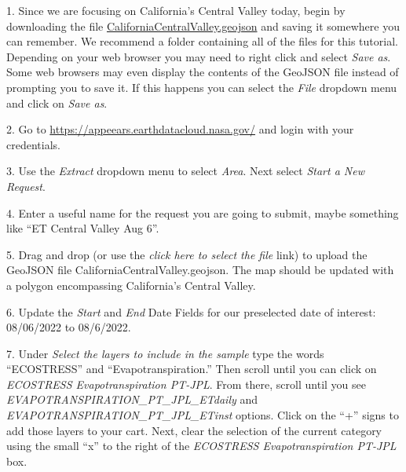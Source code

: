 \documentclass[oneside,a4paper,11pt,explicit]{book}
\begin{document}
1. Since we are focusing on California's Central Valley today, begin by downloading the file \href{https://jeremydforsythe.github.io/icecream-tutorials/Tutorial9_Evaportranspiration1/CaliforniaCentralValley.geojson}{CaliforniaCentralValley.geojson} and saving it somewhere you can remember. We recommend a folder containing all of the files for this tutorial. Depending on your web browser you may need to right click and select \textit{Save as}. Some web browsers may even display the contents of the GeoJSON file instead of prompting you to save it. If this happens you can select the \textit{File} dropdown menu and click on \textit{Save as}. 


2. Go to \href{https://appeears.earthdatacloud.nasa.gov/}{https://appeears.earthdatacloud.nasa.gov/} and login with your credentials. 

3. Use the \textit{Extract} dropdown menu to select \textit{Area}. Next select \textit{Start a New Request}. 

4. Enter a useful name for the request you are going to submit, maybe something like ``ET Central Valley Aug 6''. 

5. Drag and drop (or use the \textit{click here to select the file} link) to upload the GeoJSON file CaliforniaCentralValley.geojson. The map should be updated with a polygon encompassing California's Central Valley.

6. Update the \textit{Start} and \textit{End} Date Fields for our preselected date of interest: 08/06/2022 to 08/6/2022.

7. Under \textit{Select the layers to include in the sample} type the words ``ECOSTRESS'' and ``Evapotranspiration.'' Then scroll until you can click on \textit{ECOSTRESS Evapotranspiration PT-JPL}. From there, scroll until you see \textit{EVAPOTRANSPIRATION\_PT\_JPL\_ETdaily} and \textit{EVAPOTRANSPIRATION\_PT\_JPL\_ETinst} options. Click on the ``+'' signs to add those layers to your cart. Next, clear the selection of the current category using the small ``x'' to the right of the \textit{ECOSTRESS Evapotranspiration PT-JPL} box.
\end{document}
